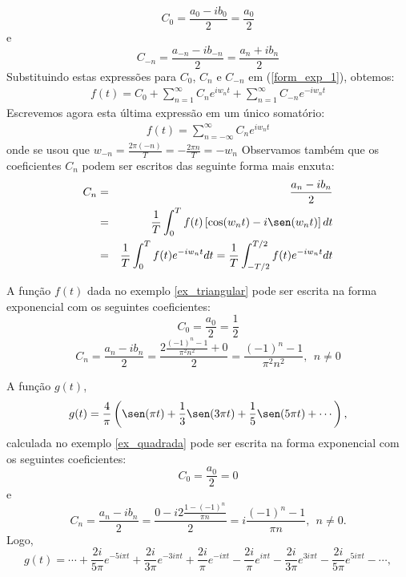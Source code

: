 \begin{equation}
C_0 = \frac{a_0 - ib_0}{2}=\frac{a_0}{2}
\end{equation}
e
\begin{equation}
C_{-n} = \frac{a_{-n} - ib_{-n}}{2}=\frac{a_{n} + ib_{n}}{2}
\end{equation}
Substituindo estas expressões para $C_0$, $C_{n}$ e $C_{-n}$ em (\ref{form_exp_1}), obtemos:
\begin{eqnarray*}
f(t)=C_0+\sum_{n=1}^\infty C_n e^{iw_nt}+\sum_{n=1}^\infty C_{-n}e^{-iw_nt}
\end{eqnarray*}
Escrevemos agora esta última expressão em um único somatório:
\begin{eqnarray}\label{forma_exp}
f(t)=\sum_{n=-\infty}^\infty C_n e^{iw_nt}
\end{eqnarray}
onde se usou que $w_{-n}=\frac{2\pi (-n)}{T}=-\frac{2\pi n}{T}=-w_n$
Observamos também que os coeficientes $C_n$ podem ser escritos das seguinte forma mais enxuta:
\begin{eqnarray*}
C_n &=& \frac{a_n - ib_n}{2}\\
&=& \frac{1}{T}\int_0^Tf(t)\left[\cos(w_n t)-i\sen(w_n t)\right]dt\\
&=&\frac{1}{T}\int_0^Tf(t)e^{-iw_nt}dt =\frac{1}{T}\int_{-T/2}^{T/2}f(t)e^{-iw_nt}dt 
\end{eqnarray*}
\begin{ex}{\label{ex_exp_1}} A função $f(t)$ dada no exemplo \ref{ex_triangular} pode ser escrita na forma exponencial com os seguintes coeficientes:
\begin{equation}C_0=\frac{a_0}{2}=\frac{1}{2}\end{equation}
\begin{equation}C_n=\frac{a_n-ib_n}{2}=\frac{2\frac{(-1)^n-1}{\pi^2n^2}+0}{2}=\frac{(-1)^n-1}{\pi^2n^2},~~n\neq 0\end{equation}
\end{ex}
\begin{ex}{\label{ex_exp_2}} A função $g(t)$,
\begin{equation}
g(t)=\frac{4}{\pi}\left(\sen(\pi t)+\frac{1}{3}\sen(3\pi t)+\frac{1}{5}\sen(5\pi t)+\cdots\right),
\end{equation}
calculada no exemplo \ref{ex_quadrada} pode ser escrita na forma exponencial com os seguintes coeficientes:
\begin{equation}C_0=\frac{a_0}{2}=0\end{equation}
e
\begin{equation}C_n=\frac{a_n-ib_n}{2}=\frac{0-i2\frac{1-(-1)^n}{\pi n}}{2}=i\frac{(-1)^n-1}{\pi n},~~n\neq 0.\end{equation}
Logo,
\begin{equation}
g(t)=\cdots+\frac{2i}{5\pi}e^{-5i\pi t}+\frac{2i}{3\pi}e^{-3i\pi t}+\frac{2i}{\pi}e^{-i\pi t}-\frac{2i}{\pi}e^{i\pi t}-\frac{2i}{3\pi}e^{3i\pi t}-\frac{2i}{5\pi}e^{5i\pi t}-\cdots,
\end{equation}
\end{ex}

